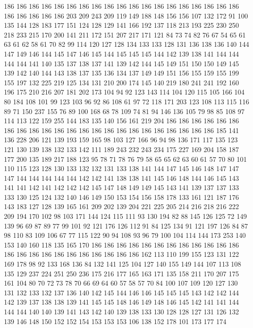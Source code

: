 186 186 186 186 186 186 186 186 186 186 186 186 186 186 186 186 186 186 186 186
186 186 186 186 203 209 243 209 119 149 188 148 156 156 107 132 172 91 100 135
144 128 183 177 151 124 128 129 141 166 192 137 118 213 193 225 230 250 218 233
215 170 200 141 211 172 151 207 217 171 121 84 73 74 82 76 67 54 65 61
63 61 62 58 61 70 82 99 114 120 127 128 134 133 133 128 131 136 138 136
140 144 147 149 146 144 145 147 146 145 144 145 145 145 144 142 139 138 141 144
144 144 144 141 140 135 137 138 137 141 139 142 144 145 149 151 150 150 149 145
139 142 140 144 143 138 137 135 136 134 137 149 149 151 156 155 159 155 199 155
197 132 225 219 125 134 131 210 200 174 145 140 219 180 241 241 192 160 196 175
210 216 207 181 202 173 104 94 92 123 143 114 104 120 115 105 166 104 80 184
108 101 99 123 103 96 92 86 108 61 97 72 118 171 203 123 108 113 115 116
89 71 150 237 155 76 89 100 168 68 78 109 74 81 94 146 136 105 79 98
85 108 97 114 113 122 159 255 144 183 135 140 156 161 219 204 186 186 186 186
186 186 186 186 186 186 186 186 186 186 186 186 186 186 186 186 186 186 186 185
141 136 228 206 121 139 193 159 165 98 103 127 166 96 94 98 136 171 117 135
123 121 130 139 138 132 133 142 111 189 243 232 243 234 175 227 169 204 158 187
177 200 135 189 217 188 123 95 78 71 78 76 79 58 65 65 62 63 60 61
57 70 80 101 110 115 123 128 130 133 132 132 131 133 138 141 144 147 145 146
148 147 147 147 144 144 144 144 144 142 142 141 138 138 141 145 146 148 144 146
145 143 141 141 142 141 142 142 142 145 147 148 149 149 145 143 141 139 137 137
133 133 130 125 124 132 140 146 149 150 153 154 156 158 178 133 161 121 187 176
143 183 127 128 139 165 161 209 202 139 204 221 225 205 214 216 218 216 222 209
194 170 102 98 103 171 144 124 115 111 93 130 194 82 88 145 126 125 72 149
139 96 69 87 89 77 99 101 92 121 176 126 112 91 84 125 134 91 121 197
126 84 87 98 110 83 109 106 67 77 115 122 90 94 108 93 96 79 100 104
114 144 173 253 140 153 140 160 118 135 165 170 186 186 186 186 186 186 186 186
186 186 186 186 186 186 186 186 186 186 186 186 186 186 186 162 113 110 199 155
123 131 122 169 178 98 92 133 168 136 84 132 141 125 104 127 140 155 149 144
107 113 108 135 129 237 224 251 250 236 175 216 177 165 163 171 135 158 211 170
207 175 161 104 80 70 72 73 78 70 66 69 64 60 57 58 57 70 84 100
107 109 120 127 130 131 132 133 132 137 136 140 142 145 144 146 146 145 145 145
143 142 142 144 142 139 137 138 138 139 141 145 145 148 146 149 148 146 145 142
141 141 144 144 144 140 140 139 141 143 142 140 139 138 133 130 128 128 127 131
126 132 139 146 148 150 152 152 154 153 153 153 106 138 152 178 101 173 177 174
